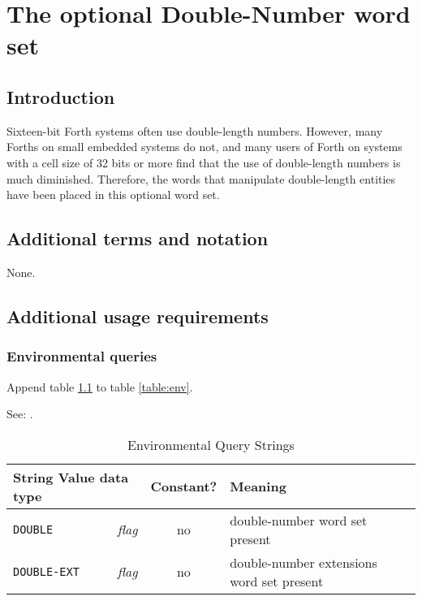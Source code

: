 \chapter{The optional Double-Number word set} %

\section{Introduction} %

Sixteen-bit Forth systems often use double-length numbers. However,
many Forths on small embedded systems do not, and many users of Forth
on systems with a cell size of 32 bits or more find that the use of
double-length numbers is much diminished. Therefore, the words that
manipulate double-length entities have been placed in this optional
word set.

\section{Additional terms and notation} %

None.

\section{Additional usage requirements} %

\subsection{Environmental queries} %

Append table \ref{double:env} to table \ref{table:env}.

See: .

\begin{table}[ht]
  \begin{center}
	\caption{Environmental Query Strings}
	\label{double:env}
	\begin{tabular}{p{9em}rcp{}}
		\hline\hline
		\multicolumn{2}{l}{String \hfill Value data type} & Constant? & Meaning \\
		\hline
		\texttt{DOUBLE}		& \emph{flag}	& no	&
			double-number word set present \\
		\texttt{DOUBLE-EXT}	& \emph{flag}	& no	&
			double-number extensions word set present \\
		\hline\hline
	\end{tabular}
  \end{center}
\end{table}

